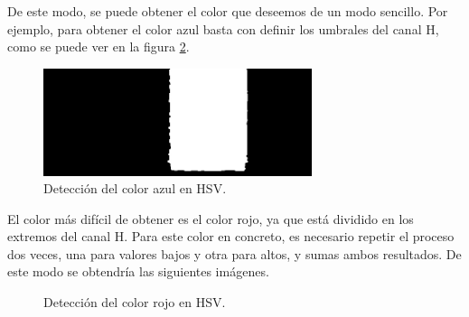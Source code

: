 De este modo, se puede obtener el color que deseemos de un modo sencillo. Por ejemplo, para obtener el color azul basta con definir los umbrales del canal H, como se puede ver en la figura \ref{azulhsv}.\\
\begin{figure}[h]
\centering
\includegraphics[width=0.7\textwidth]{images/azul.jpg}%
\caption{Detección del color azul en HSV.}
\label{azulhsv}
\end{figure}
\FloatBarrier
El color más difícil de obtener es el color rojo, ya que está dividido en los extremos del canal H. Para este color en concreto, es necesario repetir el proceso dos veces, una para valores bajos y otra para altos, y sumas ambos resultados. De este modo se obtendría las siguientes imágenes.\\

\begin{figure}[h]
\centering
{}

\caption{Detección del color rojo en HSV.}
\label{azulhsv}
\end{figure}
\FloatBarrier

